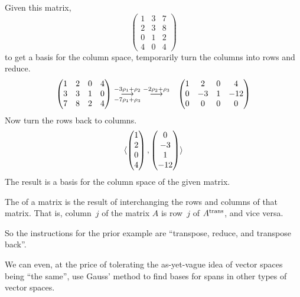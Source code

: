 \begin{example}   \label{ex:BasisForColSpace}
Given this matrix,
\begin{equation*}
  \begin{pmatrix}
    1  &3  &7  \\
    2  &3  &8  \\
    0  &1  &2  \\
    4  &0  &4
  \end{pmatrix}
\end{equation*}
to get a basis for the column space,
temporarily turn the columns into rows and reduce.
\begin{eqnarray*}
    \begin{pmatrix}
       1  &2  &0  &4  \\
       3  &3  &1  &0  \\
       7  &8  &2  &4
    \end{pmatrix}
  &\grstep[-7\rho_1+\rho_3]{-3\rho_1+\rho_2}
  \;\grstep{-2\rho_2+\rho_3}
  &\begin{pmatrix}
     1  &2  &0  &4  \\
     0  &-3 &1  &-12\\
     0  &0  &0  &0
  \end{pmatrix}
\end{eqnarray*}
Now turn the rows back to columns.
\begin{equation*}
  \sequence{
     \colvec{1 \\ 2 \\ 0 \\ 4},
     \colvec{0 \\ -3 \\ 1 \\ -12} }
\end{equation*}
The result is a basis for the column space of the given matrix.
\end{example}

\begin{definition}
The 
of a matrix is the result of interchanging the rows and
columns of that matrix.
That is, column~\( j \) of the matrix \( A \) is row~\( j \)
of \( \trans{A} \), and vice versa.
\end{definition}
\noindent So the instructions for the prior example are ``transpose,
reduce, and transpose back''.

We can even, at the price of tolerating the as-yet-vague idea of vector
spaces being ``the same'',
use Gauss' method to find bases for spans in other types of vector spaces.

